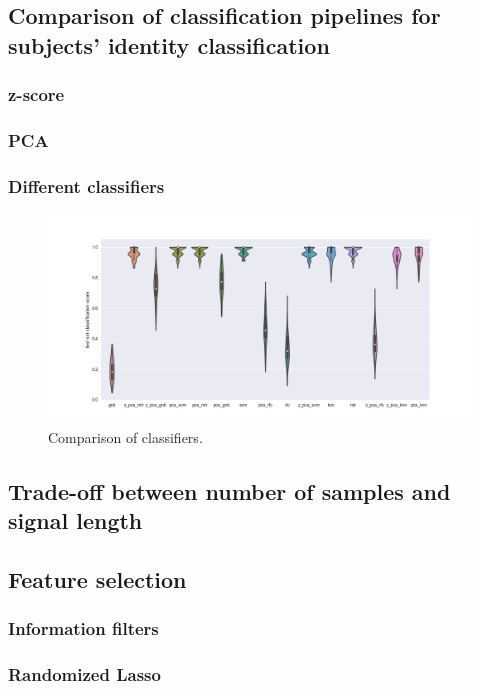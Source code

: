 \documentclass[12pt, a4paper, final, fleqn]{article}
\begin{document}
\subsection{Comparison of classification pipelines for subjects' identity classification}
\subsubsection{z-score}
\subsubsection{PCA}
\subsubsection{Different classifiers}

\begin{figure}[!htb]
\begin{center}
\includegraphics[width=0.89\columnwidth]{comparison_clf_subj_moviedata}
  \caption[Comparison of classifiers]{Comparison of classifiers.
	  \label{fig:clf_comp}}
\end{center}
\end{figure}
\subsection{Trade-off between number of samples and signal length}
\subsection{Feature selection}
\subsubsection{Information filters}
\subsubsection{Randomized Lasso}
\end{document}
